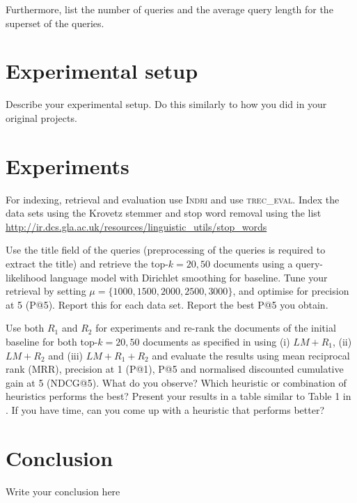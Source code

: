 \documentclass{sig-alternate}
\begin{document}
Furthermore, list the number of queries and the average query length for the superset of the queries.

\section{Experimental setup}
Describe your experimental setup. Do this similarly to how you did in your original projects.

\section{Experiments}
For indexing, retrieval and evaluation use \textsc{Indri} and use \textsc{trec\_eval}. Index the data sets using the Krovetz stemmer and stop word removal using the list \url{http://ir.dcs.gla.ac.uk/resources/linguistic_utils/stop_words}

Use the title field of the queries (preprocessing of the queries is required to extract the title) and retrieve the top-$k = 20,50$ documents using a query-likelihood language model with Dirichlet smoothing for baseline. Tune your retrieval by setting $\mu = \{1000,1500,2000,2500,3000\}$, and optimise for precision at 5 (P@5). Report this for each data set. Report the best P@5 you obtain. 

Use both $R_1$ and $R_2$ for experiments and re-rank the documents of the initial baseline for both top-$k = 20,50$ documents as specified in \cite{woo2010achieving} using (i) $LM+R_1$, (ii) $LM+R_2$ and (iii) $LM+R_1+R_2$ and evaluate the results using mean reciprocal rank (MRR), precision at 1 (P@1), P@5 and normalised discounted cumulative gain at 5 (NDCG@5). What do you observe? Which heuristic or combination of heuristics performs the best? Present your results in a table similar to Table 1 in \cite{woo2010achieving}. If you have time, can you come up with a heuristic that performs better?

\section{Conclusion}
Write your conclusion here

\end{document}
